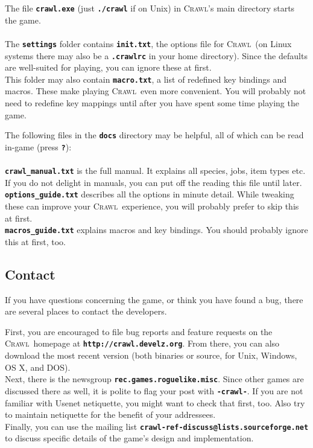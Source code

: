 \documentclass[a4paper,10pt]{article}
\newcommand{\key}[1]{{{\texttt{\textbf{#1}}}}} %
\newcommand{\slsl}{/\hspace{-0.2em}/} %
\newcommand{\crawl}{\textsc{Crawl}}
\newcommand{\spacecolumn}{\begin{minipage}[t]{2cm}\phantom{xxxx}\end{minipage}}
\begin{document}
\begin{minipage}[t]{7cm}
The file \key{crawl.exe} (just \key{./crawl} if on Unix) in \crawl's main 
directory starts the game.
\\ \\
The \key{settings} folder contains \key{init.txt}, the options file for
\crawl\ (on Linux systems there may also be a \key{.crawlrc} in your home
directory). Since the defaults are well-suited for playing, you can ignore
these at first.
\\
This folder may also contain \key{macro.txt}, a list of redefined key 
bindings and macros. These make playing \crawl\ even more convenient. 
You will probably not need to redefine key mappings until after you have
spent some time playing the game.
\end{minipage}
%
\spacecolumn
%
\begin{minipage}[t]{7cm}
The following files in the \key{docs} directory may be helpful, all of
which can be read in-game (press \key{?}):
\\ \\
\key{crawl\_manual.txt} is the full manual. It explains all species, jobs, 
item types etc. If you do not delight in manuals, you can put off the 
reading this file until later.
\\
\key{options\_guide.txt} describes all the options in minute detail. While
tweaking these can improve your \crawl\ experience, you will probably prefer
to skip this at first.
\\
\key{macros\_guide.txt} explains macros and key bindings. You should probably
ignore this at first, too.
\end{minipage}

\subsection*{Contact}
	    
If you have questions concerning the game, or think you have found a bug, 
there are several places to contact the developers. 

First, you are encouraged to file bug reports and feature requests on the 
\crawl\ homepage at \key{http:\slsl crawl.develz.org}. From there, you 
can also download the most recent version (both binaries or source, for 
Unix, Windows, OS X, and DOS).
\\
Next, there is the newsgroup \key{rec.games.roguelike.misc}. Since other 
games are discussed there as well, it is polite to flag your post with 
\key{-crawl-}. If you are not familiar with Usenet netiquette, you might 
want to check that first, too. Also try to maintain netiquette for the 
benefit of your addressees.
\\
Finally, you can use the mailing list 
\key{crawl-ref-discuss@lists.sourceforge.net}
to discuss specific details of the game's design and implementation.
\end{document}
